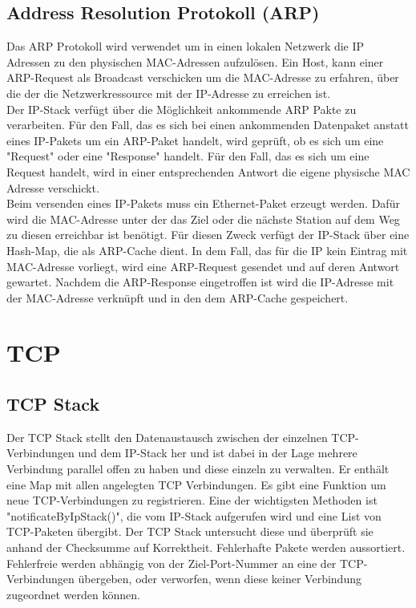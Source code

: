 \subsection{Address Resolution Protokoll (ARP)}
Das ARP Protokoll wird verwendet um in einen lokalen Netzwerk die IP Adressen zu den physischen MAC-Adressen aufzulösen. Ein Host, kann einer ARP-Request als Broadcast verschicken um die MAC-Adresse zu erfahren, über die der die Netzwerkressource mit der IP-Adresse zu erreichen ist. \\

Der IP-Stack verfügt über die Möglichkeit ankommende ARP Pakte zu verarbeiten. Für den Fall, das es sich bei einen ankommenden Datenpaket anstatt eines IP-Pakets um ein ARP-Paket handelt, wird geprüft, ob es sich um eine {}"Request"{} oder eine {}"Response"{} handelt. Für den Fall, das es sich um eine Request handelt, wird in einer entsprechenden Antwort die eigene physische MAC Adresse verschickt. \\

Beim versenden eines IP-Pakets muss ein Ethernet-Paket erzeugt werden. Dafür wird die MAC-Adresse unter der das Ziel oder die nächste Station auf dem Weg zu diesen erreichbar ist benötigt. Für diesen Zweck verfügt der IP-Stack über eine Hash-Map, die als ARP-Cache dient. In dem Fall, das für die IP kein Eintrag mit MAC-Adresse vorliegt, wird eine ARP-Request gesendet und auf deren Antwort gewartet. Nachdem die ARP-Response eingetroffen ist wird die IP-Adresse mit der MAC-Adresse verknüpft und in den dem ARP-Cache gespeichert. 


 



\section{TCP}

\subsection{TCP Stack}
Der TCP Stack stellt den Datenaustausch zwischen der einzelnen TCP-Verbindungen und dem IP-Stack her und ist dabei in der Lage mehrere Verbindung parallel offen zu haben und diese einzeln zu verwalten. 
Er enthält eine Map mit allen angelegten TCP Verbindungen. Es gibt eine Funktion um neue TCP-Verbindungen zu registrieren. Eine der wichtigsten Methoden ist "notificateByIpStack()", die vom IP-Stack aufgerufen wird und eine List von TCP-Paketen übergibt. Der TCP Stack untersucht diese und überprüft sie anhand der Checksumme auf Korrektheit. Fehlerhafte Pakete werden aussortiert. Fehlerfreie werden abhängig von der Ziel-Port-Nummer an eine der TCP-Verbindungen übergeben, oder verworfen, wenn diese keiner Verbindung zugeordnet werden können.   

